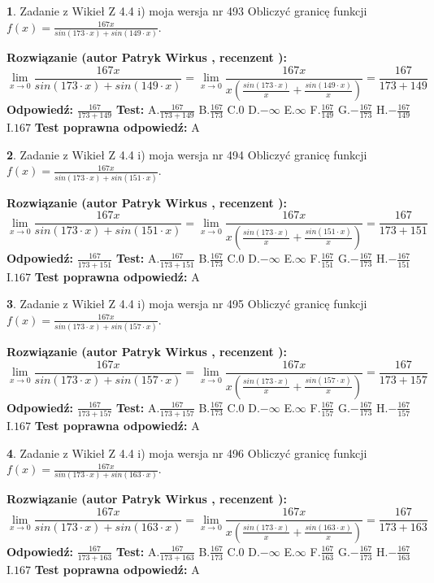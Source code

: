 \documentclass[12pt, a4paper]{article}
\theoremstyle{definition} %
\newtheorem{zad}{}
\newcommand{\zadStart}[1]{\begin{zad}#1\newline}
\newcommand{\zadStop}{\end{zad}}
\newcommand{\rozwStart}[2]{\noindent \textbf{Rozwiązanie (autor #1 , recenzent #2): }\newline}
\newcommand{\rozwStop}{\newline}
\newcommand{\odpStart}{\noindent \textbf{Odpowiedź:}\newline}
\newcommand{\odpStop}{\newline}
\newcommand{\testStart}{\noindent \textbf{Test:}\newline}
\newcommand{\testStop}{\newline}
\newcommand{\kluczStart}{\noindent \textbf{Test poprawna odpowiedź:}\newline}
\newcommand{\kluczStop}{\newline}
\begin{document}
\zadStart{Zadanie z Wikieł Z 4.4 i) moja wersja nr 493}
Obliczyć granicę funkcji $f(x)=\frac{167x}{sin(173\cdot x) +sin(149\cdot x)}$.
\zadStop
\rozwStart{Patryk Wirkus}{}
$$\lim\limits_{x\to 0}\frac{167x}{sin(173\cdot x) +sin(149\cdot x)}=\lim\limits_{x\to 0}\frac{167x}{x(\frac{sin(173\cdot x)}{x}+\frac{sin(149\cdot x)}{x})}=\frac{167}{173+149}$$
\rozwStop
\odpStart
$\frac{167}{173+149}$
\odpStop
\testStart
A.$\frac{167}{173+149}$
B.$\frac{167}{173}$
C.$0$
D.$-\infty$
E.$\infty$
F.$\frac{167}{149}$
G.$-\frac{167}{173}$
H.$-\frac{167}{149}$
I.$167$
\testStop
\kluczStart
A
\kluczStop



\zadStart{Zadanie z Wikieł Z 4.4 i) moja wersja nr 494}
Obliczyć granicę funkcji $f(x)=\frac{167x}{sin(173\cdot x) +sin(151\cdot x)}$.
\zadStop
\rozwStart{Patryk Wirkus}{}
$$\lim\limits_{x\to 0}\frac{167x}{sin(173\cdot x) +sin(151\cdot x)}=\lim\limits_{x\to 0}\frac{167x}{x(\frac{sin(173\cdot x)}{x}+\frac{sin(151\cdot x)}{x})}=\frac{167}{173+151}$$
\rozwStop
\odpStart
$\frac{167}{173+151}$
\odpStop
\testStart
A.$\frac{167}{173+151}$
B.$\frac{167}{173}$
C.$0$
D.$-\infty$
E.$\infty$
F.$\frac{167}{151}$
G.$-\frac{167}{173}$
H.$-\frac{167}{151}$
I.$167$
\testStop
\kluczStart
A
\kluczStop



\zadStart{Zadanie z Wikieł Z 4.4 i) moja wersja nr 495}
Obliczyć granicę funkcji $f(x)=\frac{167x}{sin(173\cdot x) +sin(157\cdot x)}$.
\zadStop
\rozwStart{Patryk Wirkus}{}
$$\lim\limits_{x\to 0}\frac{167x}{sin(173\cdot x) +sin(157\cdot x)}=\lim\limits_{x\to 0}\frac{167x}{x(\frac{sin(173\cdot x)}{x}+\frac{sin(157\cdot x)}{x})}=\frac{167}{173+157}$$
\rozwStop
\odpStart
$\frac{167}{173+157}$
\odpStop
\testStart
A.$\frac{167}{173+157}$
B.$\frac{167}{173}$
C.$0$
D.$-\infty$
E.$\infty$
F.$\frac{167}{157}$
G.$-\frac{167}{173}$
H.$-\frac{167}{157}$
I.$167$
\testStop
\kluczStart
A
\kluczStop



\zadStart{Zadanie z Wikieł Z 4.4 i) moja wersja nr 496}
Obliczyć granicę funkcji $f(x)=\frac{167x}{sin(173\cdot x) +sin(163\cdot x)}$.
\zadStop
\rozwStart{Patryk Wirkus}{}
$$\lim\limits_{x\to 0}\frac{167x}{sin(173\cdot x) +sin(163\cdot x)}=\lim\limits_{x\to 0}\frac{167x}{x(\frac{sin(173\cdot x)}{x}+\frac{sin(163\cdot x)}{x})}=\frac{167}{173+163}$$
\rozwStop
\odpStart
$\frac{167}{173+163}$
\odpStop
\testStart
A.$\frac{167}{173+163}$
B.$\frac{167}{173}$
C.$0$
D.$-\infty$
E.$\infty$
F.$\frac{167}{163}$
G.$-\frac{167}{173}$
H.$-\frac{167}{163}$
I.$167$
\testStop
\kluczStart
A
\kluczStop
\end{document}
